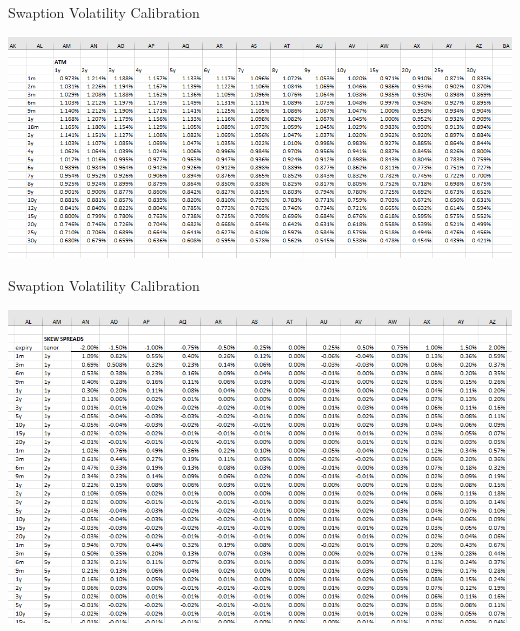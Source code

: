 \documentclass{beamer}
\begin{document}
\begin{frame}{Swaption Volatility Calibration}
  \begin{center}
    \includegraphics[width=1.\linewidth]{atm_vol}
  \end{center}
\end{frame}

\begin{frame}{Swaption Volatility Calibration}
  \begin{center}
    \includegraphics[width=1.\linewidth]{skews}
  \end{center}
\end{frame}
\end{document}
